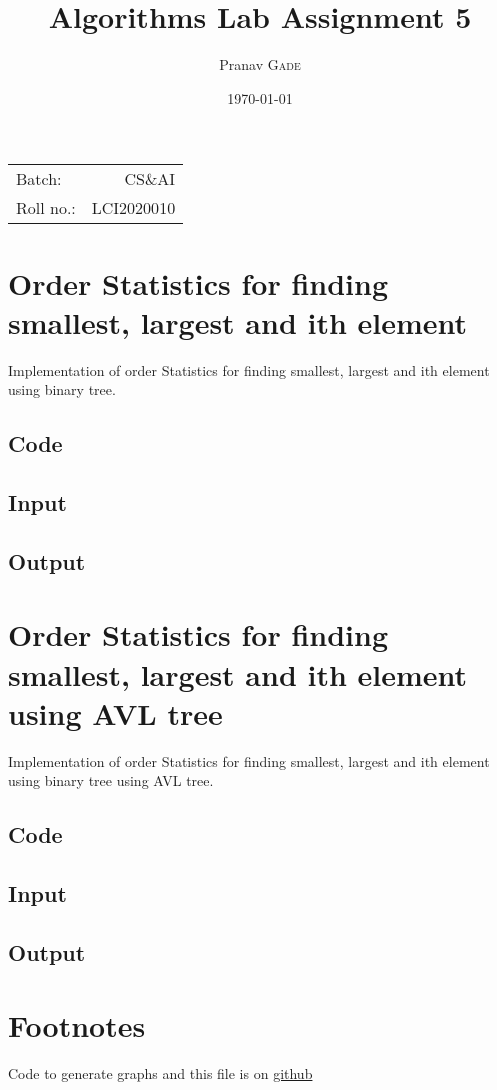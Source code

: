\documentclass{article}
\title{Algorithms Lab Assignment 5} %
\author{Pranav \textsc{Gade}} %
\date{\today} %
\begin{document}
    \maketitle %

    \begin{center}
        \begin{tabular}{l r}
            Batch:    & CS\&AI     \\
            Roll no.: & LCI2020010
        \end{tabular}
    \end{center}


    \section{Order Statistics for finding smallest, largest and ith element}
    Implementation of order Statistics for finding smallest, largest and ith element using binary tree.
    \subsection{Code}
    

    \subsection{Input}
    

    \subsection{Output}
    

    \section{Order Statistics for finding smallest, largest and ith element using AVL tree}
    Implementation of order Statistics for finding smallest, largest and ith element using binary tree using AVL tree.
    \subsection{Code}
    

    \subsection{Input}
    

    \subsection{Output}
    

    \section{Footnotes}
    Code to generate graphs and this file is on \href{https://github.com/pranavgade20/algos_complexity_benchmarker}{github}
\end{document}
